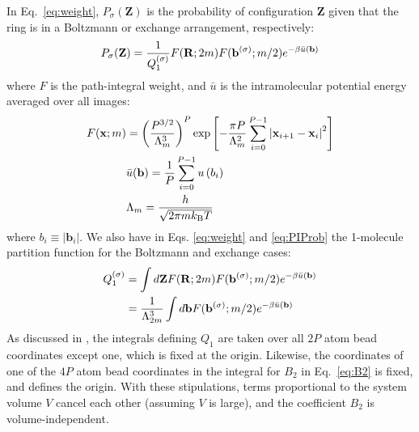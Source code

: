         In Eq.~\ref{eq:weight}, ${P_\sigma}({\mathbf Z})$ is the probability of configuration ${\mathbf Z}$ given that the ring is in a Boltzmann or exchange arrangement, respectively:
        \begin{equation}
        \label{eq:PIProb}
            P_\sigma ({\mathbf Z}) = \frac{1}{Q_1^{{\rm (\sigma)}}} F({\mathbf R};2m) F({\mathbf b}^{(\sigma)};m/2) e^{ - \beta \bar u({\mathbf b})}
        \end{equation}
        where $F$ is the path-integral weight, and $\bar u$ is the intramolecular potential energy averaged over all images:
        \begin{equation}
            \begin{aligned}
                F({\mathbf x};m) &= \left( \frac{P^{3/2}} {\Lambda _m^3} \right)^P \exp \left[ - \frac{\pi P}{\Lambda _m^2}\sum\limits_{i = 0}^{P-1} \left| {\mathbf x}_{i + 1} - {\mathbf x}_i \right|^2 \right]\\
                &\bar u({\mathbf b}) = \frac{1}{P}\sum\limits_{i=0}^{P-1} {u\left(b_i \right)} \nonumber\\
                &\Lambda_m=\frac{h}{\sqrt{2\pi m k_{\rm B}T}}\nonumber
            \end{aligned}
        \end{equation}
        where $b_i \equiv \left| {\mathbf b}_i \right|$. We also have in Eqs. \ref{eq:weight} and \ref{eq:PIProb} the 1-molecule partition function for the Boltzmann and exchange cases:
        \begin{equation}
        \label{eq:Q1}
            \begin{aligned}
                Q_1^{({\rm \sigma})} &= \int d{\mathbf Z} F({\mathbf R};2m)F({\mathbf b}^{(\sigma)};m/2) e^{ - \beta \bar u({\mathbf b})}\nonumber\\
                &=\frac{1}{\Lambda_{2m}^3}\int d{\mathbf b}F({\mathbf b}^{(\sigma)};m/2) e^{ - \beta \bar u({\mathbf b})}
            \end{aligned}
        \end{equation}
        As discussed in \cite{Garberoglio2014}, the integrals defining $Q_1$ are taken over all $2P$ atom bead coordinates except one, which is fixed at the origin. Likewise, the coordinates of one of the $4P$ atom bead coordinates in the integral for $B_2$ in Eq.~\ref{eq:B2} is fixed, and defines the origin. With these stipulations, terms proportional to the system volume $V$ cancel each other (assuming $V$ is large), and the coefficient $B_2$ is volume-independent.

